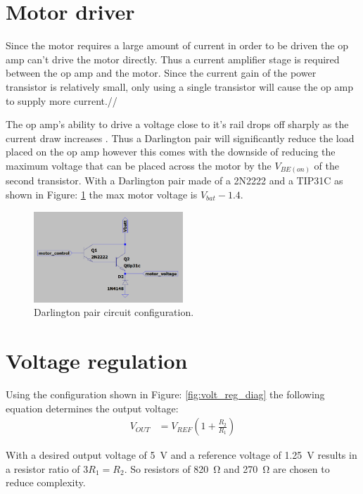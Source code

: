 \clearpage
\section{Motor driver}
Since the motor requires a large amount of current in order to be driven the op amp can't drive the motor directly. Thus a current amplifier stage is required between the op amp and the motor. Since the current gain of the power transistor is relatively small, only using a single transistor will cause the op amp to supply more current.//

The op amp's ability to drive a voltage close to it's rail drops off sharply as the current draw increases \cite{TLC2272}. Thus a Darlington pair will significantly reduce the load placed on the op amp however this comes with the downside of reducing the maximum voltage that can be placed across the motor by the $V_{BE(on)}$ of the second transistor. With a Darlington pair made of a 2N2222 and a TIP31C as shown in Figure: \ref{fig:mtrctrl_darling} the max motor voltage is $V_{bat} - 1.4$.

\begin{figure}[H]
\centering
\includegraphics[width =0.5\textwidth]{./Figures/Mtr_Ctrl_Darling_Cir.png}
\caption{Darlington pair circuit configuration.}
\label{fig:mtrctrl_darling}
\end{figure} 

\clearpage
\section{Voltage regulation}
Using the configuration shown in Figure: \ref{fig:volt_reg_diag} the following equation determines the output voltage:
\begin{align*}
V_{OUT} &= V_{REF} \left(1+\frac{R_2}{R_1}\right)
\end{align*}

With a desired output voltage of \SI{5}{\volt} and a reference voltage of \SI{1.25}{\volt} results in a resistor ratio of $3R_1 = R_2$. So resistors of \SI{820}{\ohm} and \SI{270}{\ohm} are chosen to reduce complexity.

